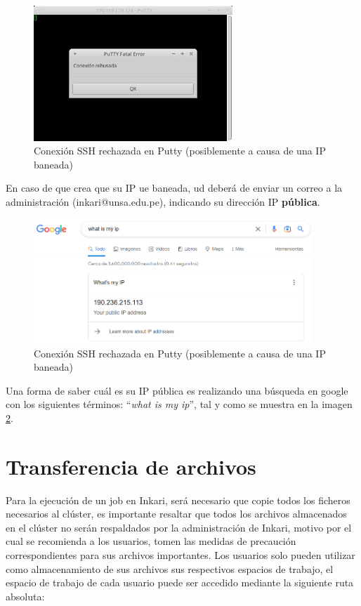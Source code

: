 \documentclass[a4paper,11pt]{article}
\begin{document}
\begin{figure}[!ht]
    \centering
    \includegraphics[width=7.5cm]{refused}
    \caption{Conexión SSH rechazada en Putty (posiblemente a causa de una IP baneada)}
    \label{fig:refused}
\end{figure}

En caso de que crea que su IP ue baneada, ud deberá de enviar un correo a la administración (inkari@unsa.edu.pe), indicando su dirección IP \textbf{pública}.

\begin{figure}[!ht]
    \centering
    \includegraphics[width=10.5cm]{google}
    \caption{Conexión SSH rechazada en Putty (posiblemente a causa de una IP baneada)}
    \label{fig:google}
\end{figure}

Una forma de saber cuál es su IP pública es realizando una búsqueda en google con los siguientes términos: ``\textit{what is my ip}'', tal y como se muestra en la imagen \ref{fig:google}.

\section{Transferencia de archivos}

Para la ejecución de un job en Inkari, será necesario que copie todos los ficheros necesarios al clúster, es importante resaltar que todos los archivos almacenados en el clúster no serán respaldados por la administración de Inkari, motivo por el cual se recomienda a los usuarios, tomen las medidas de precaución correspondientes para sus archivos importantes.
Los usuarios solo pueden utilizar como almacenamiento de sus archivos sus respectivos espacios de trabajo, el espacio de trabajo de cada usuario puede ser accedido mediante la siguiente ruta absoluta:
\end{document}

